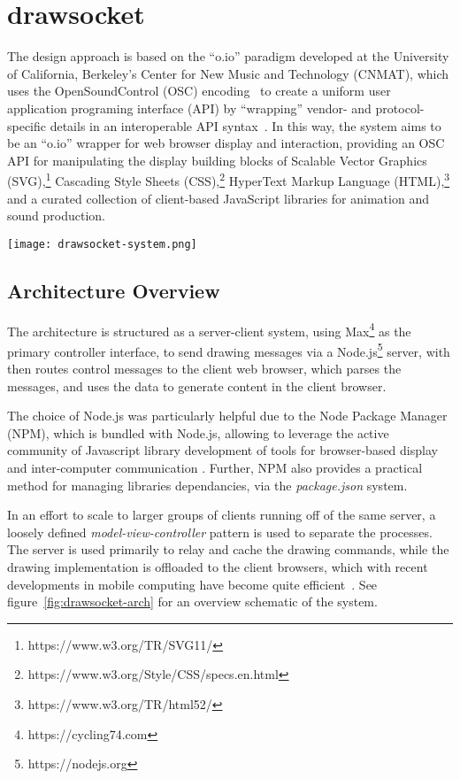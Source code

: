 \section{drawsocket}\label{sec:drawsocket}
The \drawsocket design approach is based on the ``o.io'' paradigm developed at the University of California, Berkeley's Center for New Music and Technology (CNMAT), which uses the OpenSoundControl (OSC) encoding~\cite{wright:osc} to create a uniform user application programing interface (API) by ``wrapping'' vendor- and protocol-specific details in an interoperable API syntax~\cite{freed2014io, maccallum2015dynamic}.
In this way, the \drawsocket system aims to be an ``o.io'' wrapper for web browser display and interaction, providing an OSC API for manipulating the display building blocks of Scalable Vector Graphics (SVG),\footnote{https://www.w3.org/TR/SVG11/} Cascading Style Sheets (CSS),\footnote{https://www.w3.org/Style/CSS/specs.en.html} HyperText Markup Language (HTML),\footnote{https://www.w3.org/TR/html52/} and a curated collection of client-based JavaScript libraries for animation and sound production.

\begin{figure*}[]
\centering
\texttt{[image: drawsocket-system.png]}
\caption{\drawsocket Server/Client Architecture. 
\label{fig:drawsocket-arch}}
\end{figure*}

\subsection{Architecture Overview}
The \drawsocket architecture is structured as a server-client system, using Max\footnote{https://cycling74.com}  as the primary controller interface, to send drawing messages via a Node.js\footnote{https://nodejs.org} server, with then routes control messages to the client web browser, which parses the messages, and uses the data to generate content in the client browser. 

The choice of Node.js was particularly helpful due to the Node Package Manager (NPM), which is bundled with Node.js, allowing \drawsocket to leverage the active community of Javascript library development of tools for browser-based display and inter-computer communication \cite{trockman2018adding}. 
Further, NPM also provides a practical method for managing libraries dependancies, via the \textit{package.json} system.

In an effort to scale to larger groups of clients running off of the same server, a loosely defined \textit{model-view-controller} \cite{krasner1988description} pattern is used to separate the processes. 
The server is used primarily to relay and cache the drawing commands, while the drawing implementation is offloaded to the client browsers, which with recent developments in mobile computing have become quite efficient~\cite{halpern2016mobile}.
See figure~\ref{fig:drawsocket-arch} for an overview schematic of the system. 

